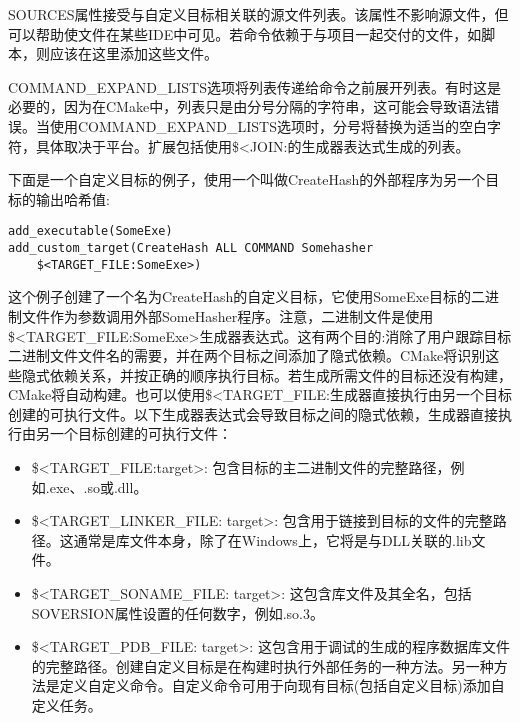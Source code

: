 SOURCES属性接受与自定义目标相关联的源文件列表。该属性不影响源文件，但可以帮助使文件在某些IDE中可见。若命令依赖于与项目一起交付的文件，如脚本，则应该在这里添加这些文件。

COMMAND\_EXPAND\_LISTS选项将列表传递给命令之前展开列表。有时这是必要的，因为在CMake中，列表只是由分号分隔的字符串，这可能会导致语法错误。当使用COMMAND\_EXPAND\_LISTS选项时，分号将替换为适当的空白字符，具体取决于平台。扩展包括使用\$<JOIN:的生成器表达式生成的列表。

下面是一个自定义目标的例子，使用一个叫做CreateHash的外部程序为另一个目标的输出哈希值:

\begin{lstlisting}[style=styleCMake]
add_executable(SomeExe)
add_custom_target(CreateHash ALL COMMAND Somehasher
	$<TARGET_FILE:SomeExe>)
\end{lstlisting}

这个例子创建了一个名为CreateHash的自定义目标，它使用SomeExe目标的二进制文件作为参数调用外部SomeHasher程序。注意，二进制文件是使用\$<TARGET\_FILE:SomeExe>生成器表达式。这有两个目的:消除了用户跟踪目标二进制文件文件名的需要，并在两个目标之间添加了隐式依赖。CMake将识别这些隐式依赖关系，并按正确的顺序执行目标。若生成所需文件的目标还没有构建，CMake将自动构建。也可以使用\$<TARGET\_FILE:生成器直接执行由另一个目标创建的可执行文件。以下生成器表达式会导致目标之间的隐式依赖，生成器直接执行由另一个目标创建的可执行文件：

\begin{itemize}
\item 
\$<TARGET\_FILE:target>: 包含目标的主二进制文件的完整路径，例如.exe、.so或.dll。

\item 
\$<TARGET\_LINKER\_FILE: target>: 包含用于链接到目标的文件的完整路径。这通常是库文件本身，除了在Windows上，它将是与DLL关联的.lib文件。

\item 
\$<TARGET\_SONAME\_FILE: target>: 这包含库文件及其全名，包括SOVERSION属性设置的任何数字，例如.so.3。

\item
\$<TARGET\_PDB\_FILE: target>: 这包含用于调试的生成的程序数据库文件的完整路径。创建自定义目标是在构建时执行外部任务的一种方法。另一种方法是定义自定义命令。自定义命令可用于向现有目标(包括自定义目标)添加自定义任务。
\end{itemize}


